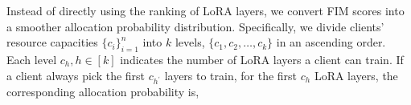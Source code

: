 \documentclass[lettersize,journal]{IEEEtran}
\begin{document}

Instead of directly using the ranking of LoRA layers, 
we convert FIM scores into a smoother allocation probability distribution. 
%
Specifically, we divide clients' resource capacities $\{c_i\}_{i=1}^n$ into $k$ levels, $\{c_1, c_2, \dots, c_k\}$ in an ascending order. Each level $c_h, h\in[k]$ indicates the number of LoRA layers a client can train. 
%
If a client always pick the first $c_{h^{\prime}}$ layers to train, for the first $c_h$ LoRA layers, the corresponding allocation probability is,
\end{document}

